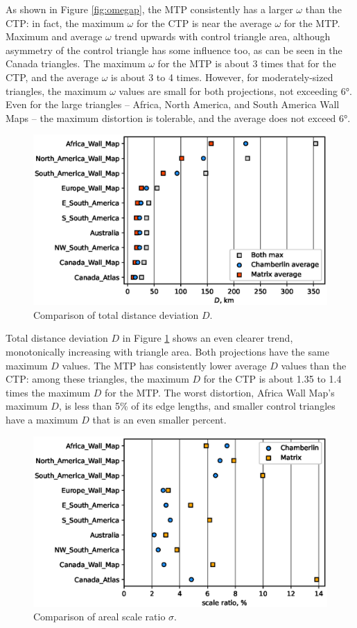 \documentclass[]{interact}
\begin{document}
As shown in Figure \ref{fig:omegap}, the MTP consistently has a larger $\omega$
than the CTP: in fact, the maximum $\omega$ for the CTP is near the average
$\omega$ for the MTP. Maximum and average $\omega$ trend upwards with control
triangle area, although asymmetry of the control triangle has some influence
too, as can be seen in the Canada triangles. The maximum $\omega$ for the MTP
is about 3 times that for the CTP, and the average $\omega$ is about 3 to 4
times. However, for moderately-sized triangles,
the maximum $\omega$ values are small for both projections, not exceeding 6°.
Even for the large triangles -- Africa, North America, and South America Wall
Maps -- the maximum distortion is tolerable, and the average does not exceed 6°.

\begin{figure}
  \includegraphics[width=\textwidth]{distanceplot}
  \caption{Comparison of total distance deviation $D$.}
  \label{fig:distancep}
\end{figure}

Total distance deviation $D$ in Figure \ref{fig:distancep} shows an even clearer
trend, monotonically increasing with triangle area. Both projections have the
same maximum $D$ values. The MTP has consistently lower average $D$ values than
the CTP: among these triangles, the maximum $D$ for the CTP is about
1.35 to 1.4 times the maximum $D$ for the MTP. The worst distortion,
Africa Wall Map's maximum $D$, is less than 5\% of its edge lengths, and
smaller control triangles have a maximum $D$ that is an even smaller percent.

\begin{figure}
  \includegraphics[width=\textwidth]{scaleplot}
  \caption{Comparison of areal scale ratio $\sigma$.}
  \label{fig:scalep}
\end{figure}
\end{document}
